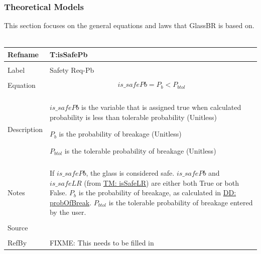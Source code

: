 \documentclass[12pt]{article}
\begin{document}
\subsubsection{Theoretical Models}
\label{Sec:TMs}
This section focuses on the general equations and laws that GlassBR is based on.
~\newline
\noindent \begin{minipage}{\textwidth}
\begin{tabular}{p{} p{}}
\toprule \textbf{Refname} & \textbf{T:isSafePb}
\label{T:isSafePb}
\\ \midrule \\
Label & Safety Req-Pb
\\ \midrule \\
Equation & \begin{dmath}
           is\_safePb={P_{b}}<{P_{btol}}
           \end{dmath}
\\ \midrule \\
Description & \begin{symbDescription}
              \item{$is\_safePb$ is the variable that is assigned true when calculated probability is less than tolerable probability (Unitless)}
              \item{${P_{b}}$ is the probability of breakage (Unitless)}
              \item{${P_{btol}}$ is the tolerable probability of breakage (Unitless)}
              \end{symbDescription}
\\ \midrule \\
Notes & If $is\_safePb$, the glass is considered safe. $is\_safePb$ and $is\_safeLR$ (from \hyperref[T:isSafeLR]{TM: isSafeLR}) are either both True or both False. ${P_{b}}$ is the probability of breakage, as calculated in \hyperref[DD:probOfBreak]{DD: probOfBreak}. ${P_{btol}}$ is the tolerable probability of breakage entered by the user.
\\ \midrule \\
Source & \cite{astm2009}
\\ \midrule \\
RefBy & FIXME: This needs to be filled in
\\ \bottomrule \end{tabular}
\end{minipage}\\
~\newline
\end{document}

